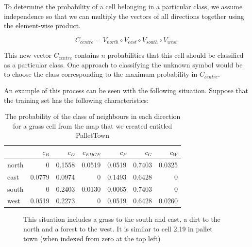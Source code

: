 \documentclass[preprint,3p,12pt]{elsarticle}
\begin{document}
To determine the probability of a cell belonging in a particular class, we assume independence
so that we can multiply the vectors of all directions together using the element-wise product.

\begin{equation}
C_{centre} = V_{north} \circ V_{east} \circ V_{south} \circ V_{west}
\end{equation}

This new vector $C_{centre}$ contains $n$ probabilities that this cell should be
classified as a particular class. One approach to classifying the unknown symbol
would be to choose the class corresponding to the maximum probability in $C_{centre}$.

An example of this process can be seen with the following situation. Suppose
that the training set has the following characteristics:

\begin{table}[h]
\small
\begin{center}
\begin{tabular}{ l | r r r r r r }
              & $c_{B}$& $c_{D}$& $c_{EDGE}$& $c_{F}$& $c_{G}$& $c_{W}$ \\ 
              \hline
    north     & 0      & 0.1558 & 0.0519    & 0.0519 & 0.7403 & 0.0325\\
    east      & 0.0779 & 0.0974 & 0         & 0.1493 & 0.6428 & 0\\
    south     & 0      & 0.2403 & 0.0130    & 0.0065 & 0.7403 & 0\\
    west      & 0.0519 & 0.2273 & 0         & 0.0519 & 0.6428 & 0.0260\\
\end{tabular}
\caption{The probability of the class of neighbours in each direction for a
    grass cell from the map that we created entitled PalletTown} 
\end{center}
\end{table}

\begin{figure}[h]
\begin{center}
\end{center}
\caption{This situation includes a grass to the south and east, a dirt to the
    north and a forest to the west. It is similar to cell 2,19 in pallet town
    (when indexed from zero at the top left)}
\end{figure}
\end{document}
